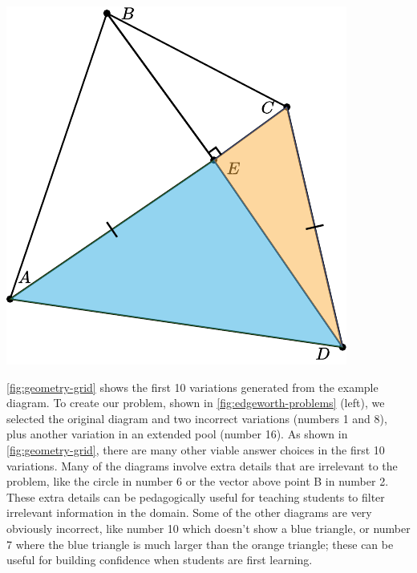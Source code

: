 \begin{center}
   \includegraphics[width=.3\linewidth]{assets/edgeworth/congruent-triangles-opt-3.pdf}
\end{center}

\cref{fig:geometry-grid} shows the first 10 variations \Edgeworth generated from the example diagram. To create our problem, shown in \cref{fig:edgeworth-problems} (left), we selected the original diagram and two incorrect variations (numbers 1 and 8), plus another variation in an extended pool (number 16). As shown in \cref{fig:geometry-grid}, there are many other viable answer choices in the first 10 variations. Many of the diagrams involve extra details that are irrelevant to the problem, like the circle in number 6 or the vector above point B in number 2. These extra details can be pedagogically useful for teaching students to filter irrelevant information in the domain. Some of the other diagrams are very obviously incorrect, like number 10 which doesn't show a blue triangle, or number 7 where the blue triangle is much larger than the orange triangle; these can be useful for building confidence when students are first learning. 







